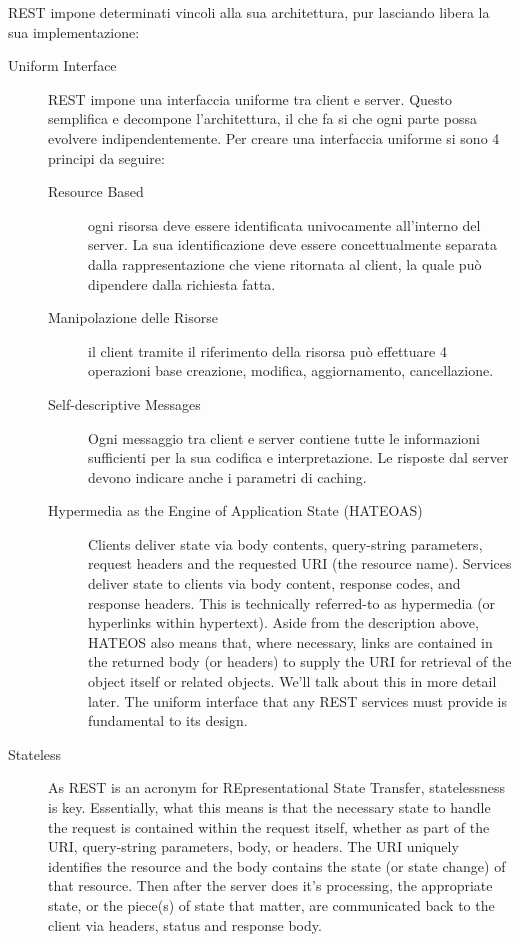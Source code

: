 REST impone determinati vincoli alla sua architettura, pur lasciando libera la sua implementazione:
\begin{description}
\item[Uniform Interface] 
REST impone una interfaccia uniforme tra client e server. Questo semplifica e decompone l'architettura, il che fa si che ogni parte possa evolvere indipendentemente. Per creare una interfaccia uniforme si sono 4 principi da seguire:
\begin{description}
\item[Resource Based] 
ogni risorsa deve essere identificata univocamente all'interno del server. La sua identificazione deve essere concettualmente separata dalla rappresentazione che viene ritornata al client, la quale può dipendere dalla richiesta fatta.
\item[Manipolazione delle Risorse] 
il client tramite il riferimento della risorsa può effettuare 4 operazioni base creazione, modifica, aggiornamento, cancellazione.
\item[Self-descriptive Messages] 
Ogni messaggio tra client e server contiene tutte le informazioni sufficienti per la sua codifica e interpretazione. Le risposte dal server devono indicare anche i parametri di caching.
\item[Hypermedia as the Engine of Application State (HATEOAS)] 
Clients deliver state via body contents, query-string parameters, request headers and the requested URI (the resource name). Services deliver state to clients via body content, response codes, and response headers. This is technically referred-to as hypermedia (or hyperlinks within hypertext).
Aside from the description above, HATEOS also means that, where necessary, links are contained in the returned body (or headers) to supply the URI for retrieval of the object itself or related objects. We'll talk about this in more detail later.
The uniform interface that any REST services must provide is fundamental to its design.
\end{description}
\item[Stateless]
As REST is an acronym for REpresentational State Transfer, statelessness is key. Essentially, what this means is that the necessary state to handle the request is contained within the request itself, whether as part of the URI, query-string parameters, body, or headers. The URI uniquely identifies the resource and the body contains the state (or state change) of that resource. Then after the server does it's processing, the appropriate state, or the piece(s) of state that matter, are communicated back to the client via headers, status and response body.


\end{description}
